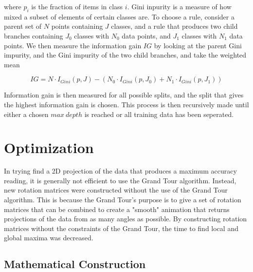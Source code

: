\documentclass[a4paper,11pt,twoside]{article}
\begin{document}
where $p_i$ is the fraction of items in class $i$. Gini inpurity is a measure of how mixed a subset of elements of certain classes are. To choose a rule, consider a parent set of $N$ points containing $J$ classes, and a rule that produces two child branches containing $J_0$ classes with $N_0$ data points, and $J_1$ classes with $N_1$ data points. We then measure the information gain $IG$ by looking at the parent Gini impurity, and the Gini impurity of the two child branches, and take the weighted mean

\begin{equation}
IG= N\cdot I_{Gini}(p, J) - (N_0\cdot I_{Gini}(p, J_0) + N_1\cdot I_{Gini}(p, J_1))
\end{equation}

Information gain is then measured for all possible splits, and the split that gives the highest information gain is chosen. This process is then recursively made until either a chosen $max \ depth$ is reached or all training data has been seperated.  

\newpage
\section{Optimization}

In trying find a 2D projection of the data that produces a maximum accuracy reading, it is generally not efficient to use the Grand Tour algorithm. Instead, new rotation matrices were constructed without the use of the Grand Tour algorithm. This is because the Grand Tour's purpose is to give a set of rotation matrices that can be combined to create a "smooth" animation that returns projections of the data from as many angles as possible. By constructing rotation matrices without the constraints of the Grand Tour, the time to find local and global maxima was decreased.

\subsection{Mathematical Construction}
\end{document}
